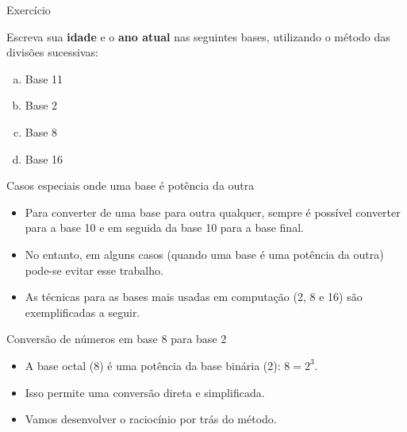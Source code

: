 \begin{frame}{Exercício}

    Escreva sua \textbf{idade} e o \textbf{ano atual} nas seguintes bases, utilizando o método das divisões sucessivas:

    \begin{enumerate}[a)]
        \item Base 11
        \item Base 2
        \item Base 8
        \item Base 16
    \end{enumerate}


\end{frame}

\begin{frame}{Casos especiais onde uma base é potência da outra}



    \begin{itemize}
        \item Para converter de uma base para outra qualquer, sempre é possível
              converter para a base 10 e em seguida da
              base 10 para a base final.

        \item No entanto, em alguns casos (quando uma base é uma potência da outra)
              pode-se evitar esse trabalho.

        \item As técnicas para as bases mais usadas em computação (2, 8 e 16) são exemplificadas a seguir.
    \end{itemize}




\end{frame}

\begin{frame}{Conversão de números em base 8 para base 2}


    \begin{itemize}
        \item A base octal (8) é uma potência da base binária (2): $8 = 2^3$.
        \item Isso permite uma conversão direta e simplificada.
        \item Vamos desenvolver o raciocínio por trás do método.
    \end{itemize}

\end{frame}

